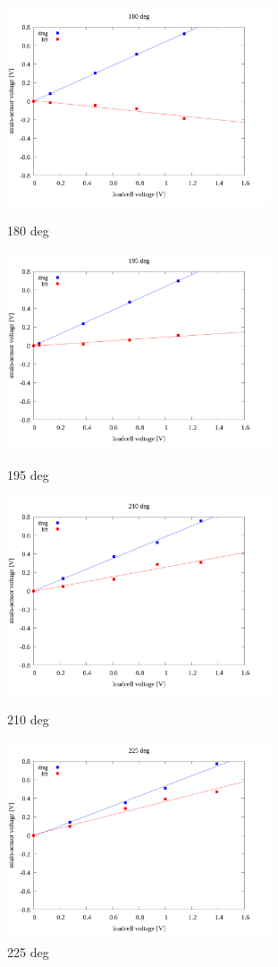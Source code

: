 \documentclass[twocolumn,a4j]{jsarticle}
\begin{document}
\par
\newpage

\begin{figure}[htbp]
    \footnotesize
    \begin{center}
        \includegraphics[width=78mm]{../images/linear/180_linear.png}
        \caption{180 deg}
        \includegraphics[width=78mm]{../images/linear/195_linear.png}
        \caption{195 deg}
        \includegraphics[width=78mm]{../images/linear/210_linear.png}
        \caption{210 deg}
        \includegraphics[width=78mm]{../images/linear/225_linear.png}
        \caption{225 deg}
    \end{center}
\end{figure}
\end{document}
